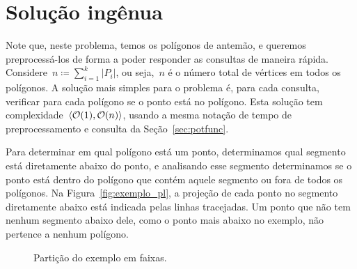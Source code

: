\documentclass[main.tex]{subfiles}
\begin{document}
\section{Solução ingênua}

Note que, neste problema, temos os polígonos de antemão, e queremos preprocessá-los de forma a poder responder as consultas de maneira rápida. Considere~${n \coloneqq \sum\limits_{i = 1}^k{|P_i|}}$, ou seja,~$n$ é o número total de vértices em todos os polígonos. A solução mais simples para o problema é, para cada consulta, verificar para cada polígono se o ponto está no polígono. Esta solução tem complexidade~$\langle\mathcal{O}(1), \mathcal{O}(n)\rangle$, usando a mesma notação de tempo de preprocessamento e consulta da Seção~\ref{sec:potfunc}.

Para determinar em qual polígono está um ponto, determinamos qual segmento está diretamente abaixo do ponto, e analisando esse segmento determinamos se o ponto está dentro do polígono que contém aquele segmento ou fora de todos os polígonos. Na Figura~\ref{fig:exemplo_pl}, a projeção de cada ponto no segmento diretamente abaixo está indicada pelas linhas tracejadas. Um ponto que não tem nenhum segmento abaixo dele, como o ponto mais abaixo no exemplo, não pertence a nenhum polígono.

\begin{figure}
\centering
{}
\caption{Partição do exemplo em faixas.} \label{fig:slabs}
\end{figure}
\end{document}
